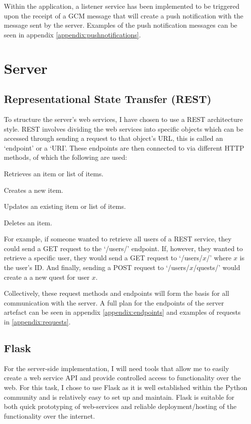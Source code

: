 Within the application, a listener service has been implemented to be triggered upon the receipt of a GCM message that will create a push notification with the message sent by the server.
Examples of the push notification messages can be seen in appendix \ref{appendix:pushnotifications}.

\section{Server}
\subsection{Representational State Transfer (REST)}
To structure the server's web services, I have chosen to use a REST architecture style.
REST involves dividing the web services into specific objects which can be accessed through sending a request to that object's URL, this is called an `endpoint' or a `URI'.
These endpoints are then connected to via different HTTP methods, of which the following are used:
\begin{description}[align=left]
	\item [GET] Retrieves an item or list of items.
	\item [POST] Creates a new item.
	\item [PUT] Updates an existing item or list of items.
	\item [DELETE] Deletes an item.
\end{description}
For example, if someone wanted to retrieve all users of a REST service, they could send a GET request to the `/users/' endpoint. 
If, however, they wanted to retrieve a specific user, they would send a GET request to `/users/$x$/' where $x$ is the user's ID.
And finally, sending a POST request to `/users/$x$/quests/' would create a a new quest for user $x$.

Collectively, these request methods and endpoints will form the basis for all communication with the server. 
A full plan for the endpoints of the server artefact can be seen in appendix \ref{appendix:endpoints} and examples of requests in \ref{appendix:requests}.

\subsection{Flask}
For the server-side implementation, I will need tools that allow me to easily create a web service API and provide controlled access to functionality over the web.
For this task, I chose to use Flask as it is well established within the Python community and is relatively easy to set up and maintain. 
Flask is suitable for both quick prototyping of web-services and reliable deployment/hosting of the functionality over the internet.

